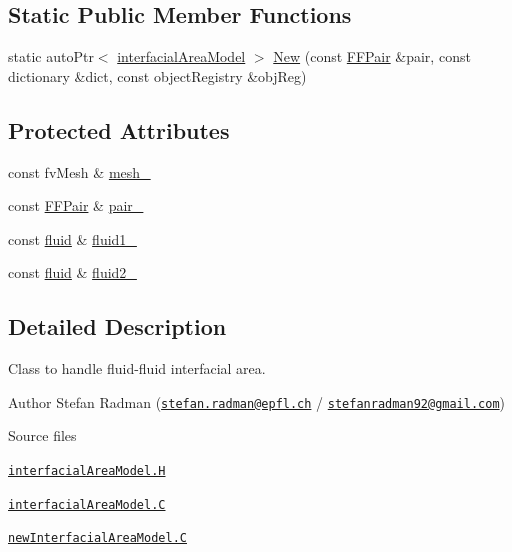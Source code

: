 \subsection*{Static Public Member Functions}
\begin{DoxyCompactItemize}
\item 
static auto\+Ptr$<$ \hyperlink{classFoam_1_1interfacialAreaModel}{interfacial\+Area\+Model} $>$ \hyperlink{classFoam_1_1interfacialAreaModel_a081ab720653d117b3290f0b6e04287de}{New} (const \hyperlink{classFoam_1_1FFPair}{F\+F\+Pair} \&pair, const dictionary \&dict, const object\+Registry \&obj\+Reg)
\end{DoxyCompactItemize}
\subsection*{Protected Attributes}
\begin{DoxyCompactItemize}
\item 
const fv\+Mesh \& \hyperlink{classFoam_1_1interfacialAreaModel_a23edeeeecebcef11921a33dd5d990570}{mesh\+\_\+}
\item 
const \hyperlink{classFoam_1_1FFPair}{F\+F\+Pair} \& \hyperlink{classFoam_1_1interfacialAreaModel_ad015e769561f394d7c717d4356dcded4}{pair\+\_\+}
\item 
const \hyperlink{classFoam_1_1fluid}{fluid} \& \hyperlink{classFoam_1_1interfacialAreaModel_a5e2d96f5c8eaf3d2ba2fd36db82b8e8b}{fluid1\+\_\+}
\item 
const \hyperlink{classFoam_1_1fluid}{fluid} \& \hyperlink{classFoam_1_1interfacialAreaModel_a10350fa01c5980453030c19e26a2253f}{fluid2\+\_\+}
\end{DoxyCompactItemize}


\subsection{Detailed Description}
Class to handle fluid-\/fluid interfacial area. 

\label{_Description}%
 Author Stefan Radman (\href{mailto:stefan.radman@epfl.ch}{\tt stefan.\+radman@epfl.\+ch} / \href{mailto:stefanradman92@gmail.com}{\tt stefanradman92@gmail.\+com})

\begin{DoxyParagraph}{Source files}

\begin{DoxyItemize}
\item \href{../../../home/carlo/data/GeN-Foam/GeN-Foam_ffn/GeN-Foam/GeN-Foam/classes/thermalHydraulics/src/physicsModels/interfacialAreaModels/interfacialAreaModel.H}{\tt interfacial\+Area\+Model.\+H} 
\item \href{../../../home/carlo/data/GeN-Foam/GeN-Foam_ffn/GeN-Foam/GeN-Foam/classes/thermalHydraulics/src/physicsModels/interfacialAreaModels/interfacialAreaModel.C}{\tt interfacial\+Area\+Model.\+C} 
\item \href{../../../home/carlo/data/GeN-Foam/GeN-Foam_ffn/GeN-Foam/GeN-Foam/classes/thermalHydraulics/src/physicsModels/interfacialAreaModels/newInterfacialAreaModel.C}{\tt new\+Interfacial\+Area\+Model.\+C} 
\end{DoxyItemize}
\end{DoxyParagraph}


